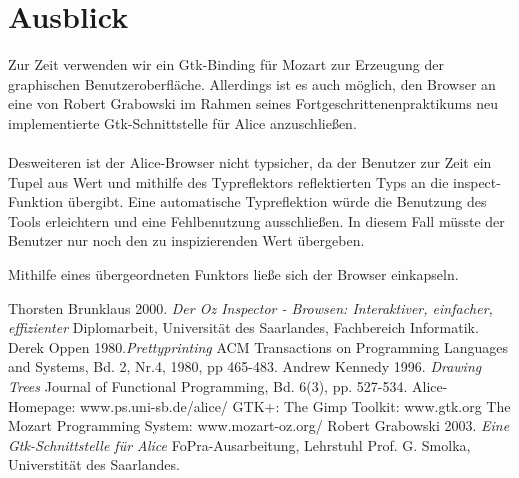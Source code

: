 \documentclass[12pt,a4paper]{article}
\begin{document}

\section{Ausblick}

Zur Zeit verwenden wir ein Gtk-Binding f\"ur Mozart \cite{mo:mo}
zur Erzeugung der graphischen Benutzeroberfl\"ache. Allerdings ist 
es auch m\"oglich, den Browser an eine von Robert Grabowski im Rahmen 
seines Fortgeschrittenenpraktikums neu implementierte Gtk-Schnittstelle
f\"ur Alice \cite{gr:gt} anzuschlie\ss en.

\paragraph{}

Desweiteren ist der Alice-Browser nicht typsicher, 
da der Benutzer zur Zeit ein Tupel aus 
Wert und mithilfe des Typreflektors reflektierten Typs 
an die inspect-Funktion \"ubergibt.  
Eine automatische Typreflektion w\"urde die Benutzung des Tools 
erleichtern und eine Fehlbenutzung ausschlie\ss en. 
In diesem Fall m\"usste der Benutzer nur noch den zu 
inspizierenden Wert \"ubergeben. 

Mithilfe eines \"ubergeordneten Funktors lie\ss e 
sich der Browser einkapseln.


\begin{thebibliography}{99}

 Thorsten Brunklaus 2000. {\em Der Oz Inspector - Browsen: 
    Interaktiver, einfacher, effizienter} Diplomarbeit, Universit\"{a}t 
    des Saarlandes, Fachbereich Informatik.
 Derek Oppen 1980.{\em Prettyprinting} ACM Transactions 
  on Programming Languages and Systems, Bd. 2, Nr.4, 1980, pp 465-483.
 Andrew Kennedy 1996. {\em Drawing Trees} 
                Journal of Functional Programming, Bd. 6(3), pp. 527-534.
 Alice-Homepage: www.ps.uni-sb.de/alice/
 GTK+: The Gimp Toolkit: www.gtk.org 
 The Mozart Programming System: www.mozart-oz.org/
 Robert Grabowski 2003. {\em Eine Gtk-Schnittstelle f\"ur 
                Alice} 
                FoPra-Ausarbeitung, Lehrstuhl Prof. G. Smolka, 
                Universtit\"at des Saarlandes.

\end{thebibliography}
\end{document}
